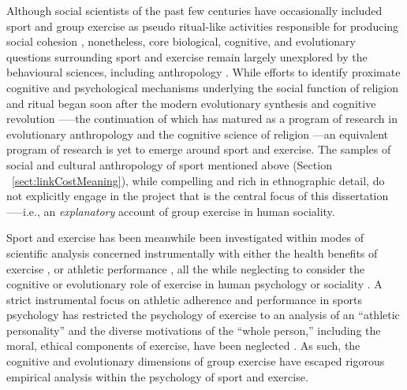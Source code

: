 \begin{CJK}{UTF8}{gbsn}
Although social scientists of the past few centuries have occasionally included sport and group exercise as pseudo ritual-like activities responsible for producing social cohesion \citep{Durkheim1965,Mauss1935,Turner1977}, nonetheless, core biological, cognitive, and evolutionary questions surrounding sport and exercise remain largely unexplored by the behavioural sciences, including anthropology \citep{Blanchard1995,Downey2005a}.    While efforts to identify proximate cognitive and psychological mechanisms underlying the social function of religion and ritual began soon after the modern evolutionary synthesis \citep{Huxley1942} and cognitive revolution \citep[e.g.,][]{Turner1986}—--the continuation of which has matured as a program of research in evolutionary anthropology and the cognitive science of religion \citep{Barrett2002,Lawson1993,Sperber1996,Whitehouse2004}---an equivalent program of research is yet to emerge around sport and exercise.  The samples of social and cultural anthropology of sport mentioned above (Section ~\ref{sect:linkCostMeaning}), while compelling and rich in ethnographic detail, do not explicitly engage in the project that is the central focus of this dissertation—--i.e., an \textit{explanatory} account of group exercise in human sociality.

Sport and exercise has been meanwhile been investigated within modes of scientific analysis concerned instrumentally with either the health benefits of exercise \citep{Fiuza-Luces2013,Morris1994}, or athletic performance \citep{Beedie2015}, all the while neglecting to consider the cognitive or evolutionary role of exercise in human psychology or sociality \citep{Balish2013,Coulter2015}. A strict instrumental focus on athletic adherence and performance in sports psychology has restricted the psychology of exercise to an analysis of an ``athletic personality'' and the diverse motivations of the ``whole person,'' including the moral, ethical components of exercise, have been neglected \citep{Coulter2015,Laborde2014}.  As such, the cognitive and evolutionary dimensions of group exercise have escaped rigorous empirical analysis within the psychology of sport and exercise.


\end{CJK}
